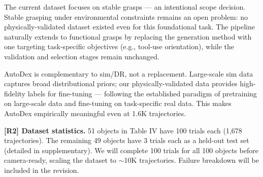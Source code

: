 \documentclass[conference]{IEEEtran}
\newcommand{\rone}{{\color{R1}R1}}
\newcommand{\rtwo}{{\color{R2}R2}}
\newcommand{\rthree}{{\color{R3}R3}}
\newcommand{\acmark}{{\color{AC}AC}}
\newcommand{\rssparagraph}[1]{{\bf #1.}}
\begin{document}
\noindent[\rone, \acmark] The current dataset focuses on stable grasps --- an intentional scope decision. Stable grasping under environmental constraints remains an open problem: no physically-validated dataset existed even for this foundational task. The pipeline naturally extends to functional grasps by replacing the generation method with one targeting task-specific objectives (e.g., tool-use orientation), while the validation and selection stages remain unchanged.

\noindent[\rthree] AutoDex is complementary to sim/DR, not a replacement. Large-scale sim data captures broad distributional priors; our physically-validated data provides high-fidelity labels for fine-tuning --- following the established paradigm of pretraining on large-scale data and fine-tuning on task-specific real data. This makes AutoDex empirically meaningful even at 1.6K trajectories.

\rssparagraph{[\rtwo] Dataset statistics}
51 objects in Table IV have 100 trials each (1,678 trajectories). The remaining 49 objects have 3 trials each as a held-out test set (detailed in supplementary). We will complete 100 trials for all 100 objects before camera-ready, scaling the dataset to $\sim$10K trajectories. Failure breakdown will be included in the revision.

{
  \small
  
  
}
\end{document}
